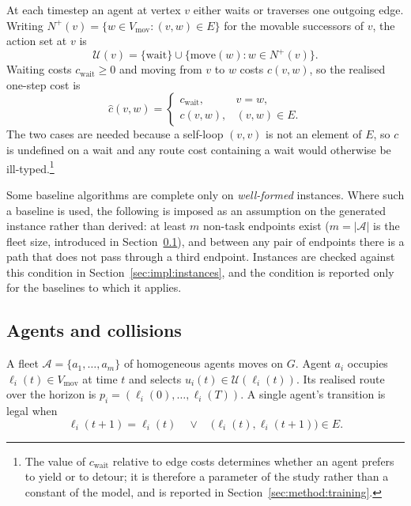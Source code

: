 \documentclass[../main.tex]{subfiles}
\begin{document}
At each timestep an agent at vertex $v$ either waits or traverses one outgoing
edge. Writing $N^{+}(v) = \{w \in V_{\mathrm{mov}} : (v,w) \in E\}$ for the
movable successors of $v$, the action set at $v$ is
\begin{equation}
  \mathcal{U}(v) = \{\mathrm{wait}\} \cup \{\mathrm{move}(w) : w \in N^{+}(v)\}.
  \label{eq:actions}
\end{equation}
Waiting costs $c_{\mathrm{wait}} \geq 0$ and moving from $v$ to $w$ costs
$c(v,w)$, so the realised one-step cost is
\begin{equation}
  \hat{c}(v,w) =
  \begin{cases}
    c_{\mathrm{wait}}, & v = w, \\
    c(v,w),            & (v,w) \in E.
  \end{cases}
  \label{eq:onestepcost}
\end{equation}
The two cases are needed because a self-loop $(v,v)$ is not an element of $E$, so
$c$ is undefined on a wait and any route cost containing a wait would otherwise be
ill-typed.\footnote{The value of $c_{\mathrm{wait}}$ relative to edge costs
determines whether an agent prefers to yield or to detour; it is therefore a
parameter of the study rather than a constant of the model, and is reported in
Section~\ref{sec:method:training}.}

Some baseline algorithms are complete only on \emph{well-formed} instances. Where
such a baseline is used, the following is imposed as an assumption on the
generated instance rather than derived: at least $m$ non-task endpoints exist
($m = |\mathcal{A}|$ is the fleet size, introduced in
Section~\ref{sec:pf:agents}), and between any pair of endpoints there is a path
that does not pass through a third endpoint. Instances are checked against this
condition in Section~\ref{sec:impl:instances}, and the condition is reported only
for the baselines to which it applies.

\subsection{Agents and collisions}
\label{sec:pf:agents}

A fleet $\mathcal{A} = \{a_1,\dots,a_m\}$ of homogeneous agents moves on $G$.
Agent $a_i$ occupies $\ell_i(t) \in V_{\mathrm{mov}}$ at time $t$ and selects
$u_i(t) \in \mathcal{U}(\ell_i(t))$. Its realised route over the horizon is
$p_i = (\ell_i(0), \dots, \ell_i(T))$. A single agent's transition is legal when
\begin{equation}
  \ell_i(t+1) = \ell_i(t)
  \quad \vee \quad
  \bigl(\ell_i(t), \ell_i(t+1)\bigr) \in E .
  \label{eq:transition}
\end{equation}
\end{document}

